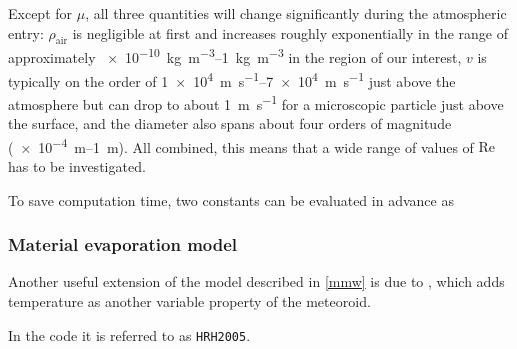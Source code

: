         Except for $\mu$, all three quantities will change significantly
        during the atmospheric entry: $\rho_\mathrm{air}$ is negligible at first
        and increases roughly exponentially in the range of approximately \SIrange{e-10}{1}{\kilo\gram\per\metre\cubed}
        in the region of our interest, $v$ is typically on the order of \SIrange{1e4}{7e4}{\metre\per\second}
        just above the atmosphere but can drop to about \SI{1}{\metre\per\second}
        for a microscopic particle just above the surface, and the diameter also spans
        about four orders of magnitude (\SIrange{e-4}{1}{\metre}).
        All combined, this means that a wide range of values of $\mathrm{Re}$ has to be investigated.


        To save computation time, two constants can be evaluated in advance as


    \subsubsection{Material evaporation model} \label{mwh}
        Another useful extension of the model described in \cref{mmw} is due to
        \cite{hill+2005}, which adds temperature as another variable property of the meteoroid.


        In the code it is referred to as \texttt{HRH2005}.

